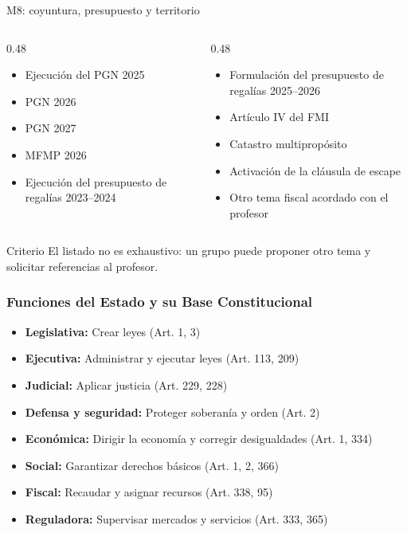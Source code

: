 \documentclass{beamer}
\begin{document}
\begin{frame}{M8: coyuntura, presupuesto y territorio}
\small
\begin{columns}[T,onlytextwidth]
  \begin{column}{0.48\textwidth}
    \begin{itemize}
      \item Ejecuci\'on del PGN 2025
      \item PGN 2026
      \item PGN 2027
      \item MFMP 2026
      \item Ejecuci\'on del presupuesto de regal\'ias 2023--2024
    \end{itemize}
  \end{column}
  \begin{column}{0.48\textwidth}
    \begin{itemize}
      \item Formulaci\'on del presupuesto de regal\'ias 2025--2026
      \item Art\'iculo IV del FMI
      \item Catastro multiprop\'osito
      \item Activaci\'on de la cl\'ausula de escape
      \item Otro tema fiscal acordado con el profesor
    \end{itemize}
  \end{column}
\end{columns}
\begin{alertblock}{Criterio}
El listado no es exhaustivo: un grupo puede proponer otro tema y solicitar referencias al profesor.
\end{alertblock}
\end{frame}

\begin{frame}
  \frametitle{Funciones del Estado y su Base Constitucional}
  \begin{itemize}
    \item \textbf{Legislativa:} Crear leyes (Art. 1, 3)
    \item \textbf{Ejecutiva:} Administrar y ejecutar leyes (Art. 113, 209)
    \item \textbf{Judicial:} Aplicar justicia (Art. 229, 228)
    \item \textbf{Defensa y seguridad:} Proteger soberan\'ia y orden (Art. 2)
    \item \textbf{Econ\'omica:} Dirigir la econom\'ia y corregir desigualdades (Art. 1, 334)
    \item \textbf{Social:} Garantizar derechos b\'asicos (Art. 1, 2, 366)
    \item \textbf{Fiscal:} Recaudar y asignar recursos (Art. 338, 95)
    \item \textbf{Reguladora:} Supervisar mercados y servicios (Art. 333, 365)
  \end{itemize}
\end{frame}
\end{document}
